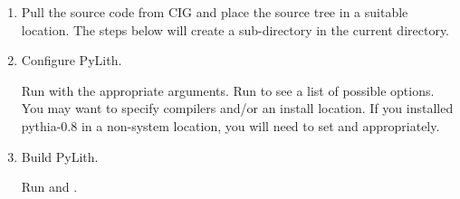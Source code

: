 \begin{enumerate}
  \begin{enumerate}
  \item Pull the source code from CIG and place the source tree in a
    suitable location. The steps below will create a
     sub-directory in the current directory.

    \begin{screen}
      \shellprompt{}
    \end{screen}

  \item Configure PyLith.
    
    Run  with the appropriate arguments. Run
     to see a list of possible options. You
    may want to specify compilers and/or an install location. If you
    installed pythia-0.8 in a non-system location, you will need to
    set  and  appropriately.

    \begin{screen}
      \shellprompt{}
      \shellprompt{}
      \shellprompt{}
    \end{screen}
    
  \item Build PyLith.

    Run  and .

    \begin{screen}
      \shellprompt{}
      \shellprompt{}
    \end{screen}
  \end{enumerate}
\end{enumerate}

